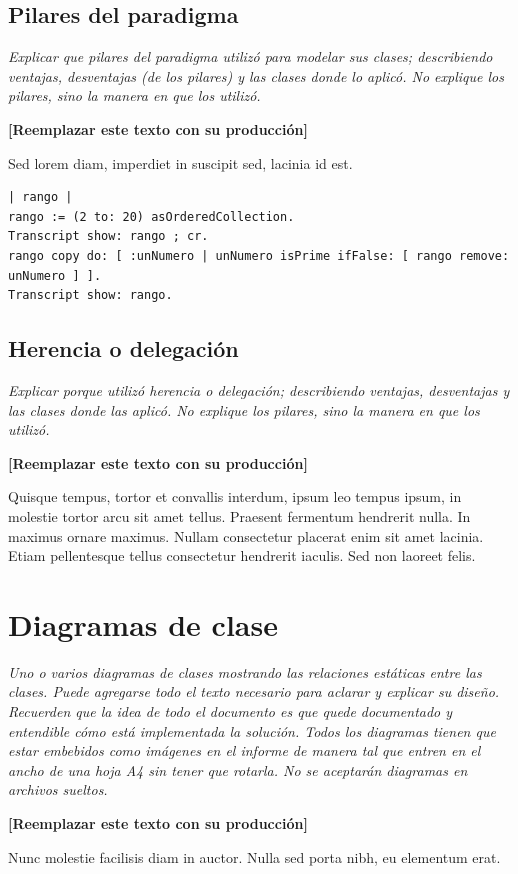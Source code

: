 \documentclass[titlepage,a4paper]{article}
\begin{document}
\subsection{Pilares del paradigma}
\textit{Explicar que pilares del paradigma utilizó para modelar sus clases; describiendo ventajas, desventajas (de los pilares) y las clases donde lo aplicó. No explique los pilares, sino la manera en que los utilizó.}
\newline
\newline
\centerline{\textbf{[Reemplazar este texto con su producción]}}
\newline
\newline
Sed lorem diam, imperdiet in suscipit sed, lacinia id est. 

\begin{verbatim}
| rango |
rango := (2 to: 20) asOrderedCollection.
Transcript show: rango ; cr.
rango copy do: [ :unNumero | unNumero isPrime ifFalse: [ rango remove: unNumero ] ].
Transcript show: rango.
\end{verbatim}

\subsection{Herencia o delegación}
\textit{Explicar porque utilizó herencia o delegación; describiendo ventajas, desventajas y las clases donde las aplicó. No explique los pilares, sino la manera en que los utilizó.}
\newline
\newline
\centerline{\textbf{[Reemplazar este texto con su producción]}}
\newline
\newline
Quisque tempus, tortor et convallis interdum, ipsum leo tempus ipsum, in molestie tortor arcu sit amet tellus. Praesent fermentum hendrerit nulla. In maximus ornare maximus. Nullam consectetur placerat enim sit amet lacinia. Etiam pellentesque tellus consectetur hendrerit iaculis. Sed non laoreet felis.

\section{Diagramas de clase}\label{sec:diagramasdeclase}
\textit{ Uno o varios diagramas de clases mostrando las relaciones estáticas entre las clases.  Puede agregarse todo el texto necesario para aclarar y explicar su diseño. Recuerden que la idea de todo el documento es que quede documentado y entendible cómo está implementada la solución. Todos los diagramas tienen que estar embebidos como imágenes en el informe de manera tal que entren en el ancho de una hoja A4 sin tener que rotarla. No se aceptarán diagramas en archivos sueltos.}
\newline
\newline
\centerline{\textbf{[Reemplazar este texto con su producción]}}
\newline
\newline
Nunc molestie facilisis diam in auctor. Nulla sed porta nibh, eu elementum erat. 
\end{document}
